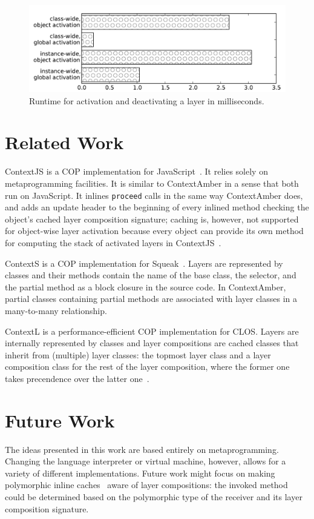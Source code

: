 \documentclass{sig-alternate}
\begin{document}
\begin{figure}[t]
    \includegraphics[width=\columnwidth]{activation_ms.pdf}
    \caption{Runtime for activation and deactivating a layer in milliseconds.}
    \label{fig:activation}
\end{figure}

\section{Related Work}
ContextJS is a COP implementation for JavaScript~\cite{Lincke:2011:OIC:1998661.1998804}. It relies solely on metaprogramming facilities. It is similar to ContextAmber in a sense that both run on JavaScript. It inlines \texttt{proceed} calls in the same way ContextAmber does, and adds an update header to the beginning of every inlined method checking the object's cached layer composition signature; caching is, however, not supported for object-wise layer activation because every object can provide its own method for computing the stack of activated layers in ContextJS~\cite{Krahn:2012:ELA:2223947.2223971}.

ContextS is a COP implementation for Squeak~\cite{Hirschfeld:2007:ICP:1462618.1462629}. Layers are represented by classes and their methods contain the name of the base class, the selector, and the partial method as a block closure in the source code. In ContextAmber, partial classes containing partial methods are associated with layer classes in a many-to-many relationship.

ContextL is a performance-efficient COP implementation for CLOS. Layers are internally represented by classes and layer compositions are cached classes that inherit from (multiple) layer classes: the topmost layer class and a layer composition class for the rest of the layer composition, where the former one takes precendence over the latter one~\cite{Costanza:2006:ELA:2111746.2111753}.

\section{Future Work}
The ideas presented in this work are based entirely on metaprogramming. Changing the language interpreter or virtual machine, however, allows for a variety of different implementations. Future work might focus on making polymorphic inline caches~\cite{Holzle:1991:ODO:646149.679193} aware of layer compositions: the invoked method could be determined based on the polymorphic type of the receiver and its layer composition signature.
\end{document}
